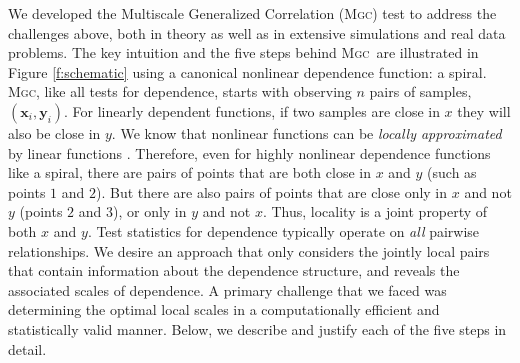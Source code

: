 \documentclass[11pt]{article}
\providecommand{\sct}[1]{{\normalfont\textsc{#1}}}
\providecommand{\mb}[1]{\boldsymbol{#1}}
\newcommand{\Mgc}{\sct{Mgc}}
\newcommand{\mbx}{\ensuremath{\mb{x}}}
\newcommand{\mby}{\ensuremath{\mb{y}}}
\begin{document}
We developed the Multiscale Generalized Correlation (\Mgc) test to address the challenges above, both in theory as well as in extensive simulations and real data problems.
The key intuition and the five steps behind  \Mgc~are illustrated in Figure \ref{f:schematic} using a canonical nonlinear dependence function: a spiral.  
\Mgc, like all tests for dependence, starts with observing $n$ pairs of samples, $(\mbx_i,\mby_i)$.  
For linearly dependent functions, if two samples are close in $x$ they will also be close in $y$.
We know that nonlinear functions can be \emph{locally approximated} by linear functions \cite{Allard2012}.
Therefore, even for highly nonlinear dependence functions like a spiral, there are pairs of points that are both close in $x$ and $y$ (such as points $1$ and $2$).  
But there are also pairs of points that are close only in $x$ and not $y$  (points $2$ and $3$), or only in $y$ and not $x$.  
Thus, locality is a joint property of both $x$ and $y$.
Test statistics for dependence typically operate on \emph{all} pairwise relationships.  
We desire an approach that only considers the jointly local pairs that contain information about the dependence structure, and reveals the associated scales of dependence. 
A primary challenge that we faced was determining the optimal local scales in a computationally efficient and statistically valid manner. Below, we describe and justify each of the five steps in detail.
\end{document}
